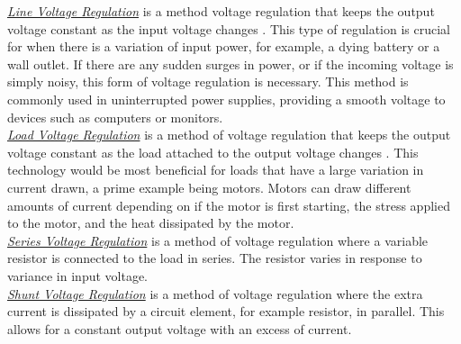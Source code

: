 \noindent \underline{\textit{Line Voltage Regulation}} is a method voltage regulation that keeps the output voltage constant as the input voltage changes \cite{geeksforgeeks_voltage_regulation}. This type of regulation is crucial for when there is a variation of input power, for example, a dying battery or a wall outlet. If there are any sudden surges in power, or if the incoming voltage is simply noisy, this form of voltage regulation is necessary. This method is commonly used in uninterrupted power supplies, providing a smooth voltage to devices such as computers or monitors.\\

\noindent \underline{\textit{Load Voltage Regulation}} is a method of voltage regulation that keeps the output voltage constant as the load attached to the output voltage changes \cite{geeksforgeeks_voltage_regulation}. This technology would be most beneficial for loads that have a large variation in current drawn, a prime example being motors. Motors can draw different amounts of current depending on if the motor is first starting, the stress applied to the motor, and the heat dissipated by the motor.\\

\noindent \underline{\textit{Series Voltage Regulation}} is a method of voltage regulation where a variable resistor is connected to the load in series. The resistor varies in response to variance in input voltage\cite{geeksforgeeks_voltage_regulation}.\\

\noindent \underline{\textit{Shunt Voltage Regulation}} is a method of voltage regulation where the extra current is dissipated by a circuit element, for example resistor, in parallel. This allows for a constant output voltage with an excess of current\cite{geeksforgeeks_voltage_regulation}.

